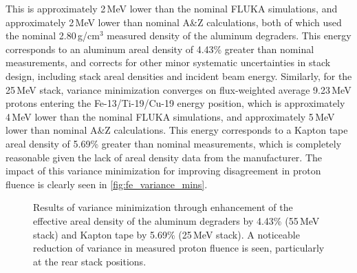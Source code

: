 This is approximately 2\,MeV lower than the nominal FLUKA simulations, and approximately 2\,MeV lower than nominal A\&Z calculations, both of which used the nominal 2.80\,g/cm$^3$ measured density of the  aluminum degraders.
This energy corresponds to an aluminum areal density of 4.43\% greater than nominal measurements, and 
corrects for other minor systematic uncertainties in stack design, including stack areal densities and incident beam energy.
Similarly, for the 25\,MeV stack, variance minimization converges on  flux-weighted average 9.23\,MeV protons entering the Fe-13/Ti-19/Cu-19 energy position, which is approximately 4\,MeV lower than the nominal FLUKA simulations, and approximately 5\,MeV lower than nominal A\&Z calculations.
This energy corresponds to a Kapton tape areal density of 5.69\% greater than nominal measurements, which is completely reasonable given the lack of areal density data from the manufacturer.
The impact of this variance minimization for improving disagreement in proton fluence is  clearly  seen in   \autoref{fig:fe_variance_mins}.




\begin{figure}
    \centering
    \caption{Results of variance minimization through enhancement of the effective areal density of the  aluminum degraders by 4.43\% (55\,MeV stack) and Kapton tape by 5.69\% (25\,MeV stack). A noticeable reduction of variance in measured proton fluence is seen,  particularly at the  rear stack positions.} 
     \label{fig:fe_variance_mins}
\end{figure}



